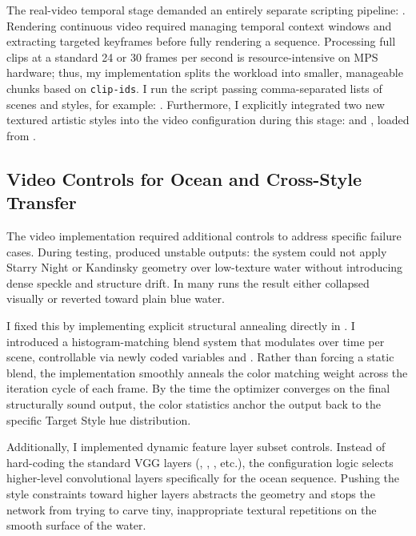 \documentclass[12pt,letterpaper]{article}
\begin{document}
The real-video temporal stage demanded an entirely separate scripting pipeline: . Rendering continuous video required managing temporal context windows and extracting targeted keyframes before fully rendering a sequence. Processing full clips at a standard 24 or 30 frames per second is resource-intensive on MPS hardware; thus, my implementation splits the workload into smaller, manageable chunks based on \texttt{clip-ids}. I run the script passing comma-separated lists of scenes and styles, for example: . Furthermore, I explicitly integrated two new textured artistic styles into the video configuration during this stage:  and , loaded from .

\subsection{Video Controls for Ocean and Cross-Style Transfer}

The video implementation required additional controls to address specific failure cases. During testing,  produced unstable outputs: the system could not apply Starry Night or Kandinsky geometry over low-texture water without introducing dense speckle and structure drift. In many runs the result either collapsed visually or reverted toward plain blue water.

I fixed this by implementing explicit structural annealing directly in . I introduced a histogram-matching blend system that modulates over time per scene, controllable via newly coded variables  and . Rather than forcing a static blend, the implementation smoothly anneals the color matching weight across the iteration cycle of each frame. By the time the optimizer converges on the final structurally sound output, the color statistics anchor the output back to the specific Target Style hue distribution.

Additionally, I implemented dynamic feature layer subset controls. Instead of hard-coding the standard VGG layers (, , , etc.), the  configuration logic selects higher-level convolutional layers specifically for the ocean sequence. Pushing the style constraints toward higher layers abstracts the geometry and stops the network from trying to carve tiny, inappropriate textural repetitions on the smooth surface of the water.
\end{document}
